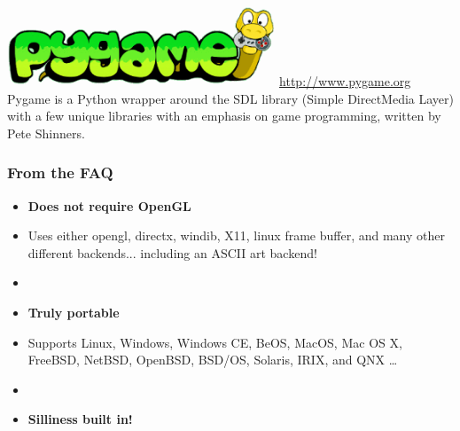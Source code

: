 \documentclass[handout]{beamer}   %
\begin{document}


\begin{frame}[plain]
\begin{center}
\includegraphics[width=0.6\textwidth]{img/pygame.png}
\vspace{1cm}
\url{http://www.pygame.org}\\
\vspace{1.4cm}
Pygame is a Python wrapper around the SDL library (Simple DirectMedia Layer) with a few unique libraries with an emphasis on game programming, written by Pete Shinners.
\end{center}
\end{frame}


\begin{frame}

\frametitle{From the FAQ}

\begin{itemize}

\item[] \textbf{Does not require OpenGL} 
\item[] Uses either opengl, directx, windib, X11, linux frame buffer, and many other different backends... including an ASCII art backend!
\item[]
\item[] \textbf{Truly portable}
\item[] Supports Linux, Windows, Windows CE, BeOS, MacOS, Mac OS X, FreeBSD, NetBSD, OpenBSD, BSD/OS, Solaris, IRIX, and QNX \dots
\item[]
\item[] \textbf{Silliness built in!}
\end{itemize}
\end{frame}
\end{document}
